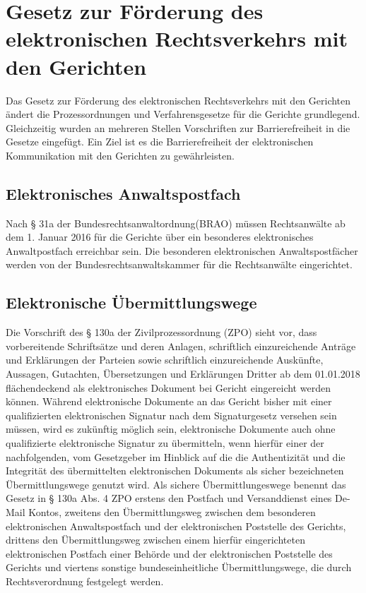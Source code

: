\section{Gesetz zur Förderung des elektronischen Rechtsverkehrs mit den Gerichten}
Das Gesetz zur Förderung des elektronischen Rechtsverkehrs mit den Gerichten ändert die Prozessordnungen und Verfahrensgesetze für die Gerichte grundlegend. Gleichzeitig wurden an mehreren Stellen Vorschriften zur Barrierefreiheit in die Gesetze eingefügt. Ein Ziel ist es die Barrierefreiheit der elektronischen Kommunikation mit den Gerichten zu gewährleisten.
\subsection*{Elektronisches Anwaltspostfach}
Nach § 31a der Bundesrechtsanwaltordnung(BRAO) müssen Rechtsanwälte ab dem 1. Januar 2016 für die Gerichte über ein besonderes elektronisches Anwaltpostfach erreichbar sein. Die besonderen elektronischen Anwaltspostfächer werden von der Bundesrechtsanwaltskammer für die Rechtsanwälte eingerichtet.
\subsection*{Elektronische Übermittlungswege}
Die Vorschrift des § 130a der Zivilprozessordnung (ZPO) sieht vor, dass vorbereitende Schriftsätze und deren Anlagen, schriftlich einzureichende Anträge und Erklärungen der Parteien sowie schriftlich einzureichende Auskünfte, Aussagen, Gutachten, Übersetzungen und Erklärungen Dritter ab dem 01.01.2018 flächendeckend als elektronisches Dokument bei Gericht eingereicht werden können. Während elektronische Dokumente an das Gericht bisher mit einer qualifizierten elektronischen Signatur nach dem Signaturgesetz versehen sein müssen, wird es zukünftig möglich sein, elektronische Dokumente auch ohne qualifizierte elektronische Signatur zu übermitteln, wenn hierfür einer der nachfolgenden, vom Gesetzgeber im Hinblick auf die die Authentizität und die Integrität des übermittelten elektronischen Dokuments als sicher bezeichneten Übermittlungswege genutzt wird. Als sichere Übermittlungeswege benennt das Gesetz in § 130a Abs. 4 ZPO erstens den Postfach und Versanddienst eines De-Mail Kontos, zweitens den Übermittlungsweg zwischen dem besonderen elektronischen Anwaltspostfach und der elektronischen Poststelle des Gerichts, drittens den Übermittlungsweg zwischen einem hierfür eingerichteten elektronischen Postfach einer Behörde und der elektronischen Poststelle des Gerichts und viertens sonstige  bundeseinheitliche Übermittlungswege, die durch Rechtsverordnung festgelegt werden.
